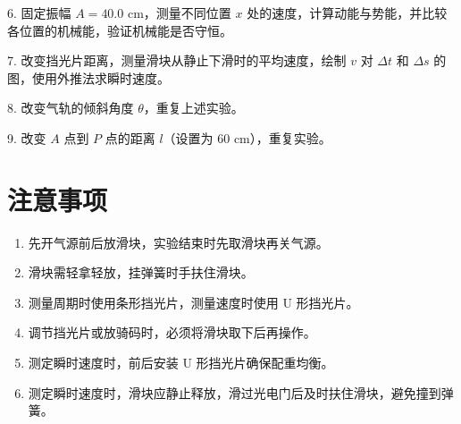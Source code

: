 \documentclass[a4paper,10pt]{article}
\begin{document}
6. 固定振幅 $A = 40.0$ cm，测量不同位置 $x$ 处的速度，计算动能与势能，并比较各位置的机械能，验证机械能是否守恒。

7. 改变挡光片距离，测量滑块从静止下滑时的平均速度，绘制 $v$ 对 $\Delta t$ 和 $\Delta s$ 的图，使用外推法求瞬时速度。

8. 改变气轨的倾斜角度 $\theta$，重复上述实验。

9. 改变 $A$ 点到 $P$ 点的距离 $l$（设置为 $60$ cm），重复实验。

\section{注意事项}

\begin{enumerate}
  \item 先开气源前后放滑块，实验结束时先取滑块再关气源。
  \item 滑块需轻拿轻放，挂弹簧时手扶住滑块。
  \item 测量周期时使用条形挡光片，测量速度时使用 U 形挡光片。
  \item 调节挡光片或放骑码时，必须将滑块取下后再操作。
  \item 测定瞬时速度时，前后安装 U 形挡光片确保配重均衡。
  \item 测定瞬时速度时，滑块应静止释放，滑过光电门后及时扶住滑块，避免撞到弹簧。
\end{enumerate}
\end{document}
